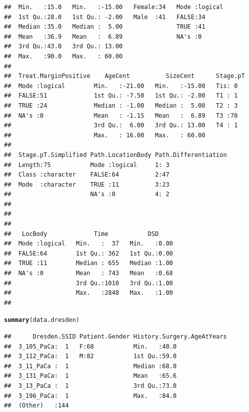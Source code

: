 \documentclass{article}\usepackage[]{graphicx}\usepackage[]{color}
\makeatletter
\newcommand{\hlstd}[1]{\textcolor[rgb]{0.345,0.345,0.345}{#1}}%
\newcommand{\hlkwd}[1]{\textcolor[rgb]{0.737,0.353,0.396}{\textbf{#1}}}%
\newenvironment{kframe}{%
 \def\at@end@of@kframe{}%
 \ifinner\ifhmode%
  \def\at@end@of@kframe{\end{minipage}}%
  \begin{minipage}{\columnwidth}%
 \fi\fi%
 \def\FrameCommand##1{\hskip\@totalleftmargin \hskip-\fboxsep
 \colorbox{shadecolor}{##1}\hskip-\fboxsep
     \hskip-\linewidth \hskip-\@totalleftmargin \hskip\columnwidth}%
 \MakeFramed {\advance\hsize-\width
   \@totalleftmargin\z@ \linewidth\hsize
   \@setminipage}}%
 {\par\unskip\endMakeFramed%
 \at@end@of@kframe}
\newenvironment{knitrout}{}{} %
\makeatother
\begin{document}
\begin{knitrout}
\begin{kframe}
\begin{verbatim}
##  Min.   :15.0   Min.   :-15.00   Female:34   Mode :logical  
##  1st Qu.:28.0   1st Qu.: -2.00   Male  :41   FALSE:34       
##  Median :35.0   Median :  5.00               TRUE :41       
##  Mean   :36.9   Mean   :  6.89               NA's :0        
##  3rd Qu.:43.0   3rd Qu.: 13.00                              
##  Max.   :90.0   Max.   : 60.00                              
##                                                             
##  Treat.MarginPositive    AgeCent          SizeCent      Stage.pT
##  Mode :logical        Min.   :-21.00   Min.   :-15.00   Tis: 0  
##  FALSE:51             1st Qu.: -7.50   1st Qu.: -2.00   T1 : 1  
##  TRUE :24             Median : -1.00   Median :  5.00   T2 : 3  
##  NA's :0              Mean   : -1.15   Mean   :  6.89   T3 :70  
##                       3rd Qu.:  6.00   3rd Qu.: 13.00   T4 : 1  
##                       Max.   : 16.00   Max.   : 60.00           
##                                                                 
##  Stage.pT.Simplified Path.LocationBody Path.Differentiation
##  Length:75           Mode :logical     1: 3                
##  Class :character    FALSE:64          2:47                
##  Mode  :character    TRUE :11          3:23                
##                      NA's :0           4: 2                
##                                                            
##                                                            
##                                                            
##   LocBody             Time           DSD      
##  Mode :logical   Min.   :  37   Min.   :0.00  
##  FALSE:64        1st Qu.: 362   1st Qu.:0.00  
##  TRUE :11        Median : 655   Median :1.00  
##  NA's :0         Mean   : 743   Mean   :0.68  
##                  3rd Qu.:1010   3rd Qu.:1.00  
##                  Max.   :2848   Max.   :1.00  
## 
\end{verbatim}
\begin{alltt}
\hlkwd{summary}\hlstd{(data.dresden)}
\end{alltt}
\begin{verbatim}
##      Dresden.SSID Patient.Gender History.Surgery.AgeAtYears
##  3_105_PaCa:  1   F:68           Min.   :40.0              
##  3_112_PaCa:  1   M:82           1st Qu.:59.0              
##  3_11_PaCa :  1                  Median :68.0              
##  3_131_PaCa:  1                  Mean   :65.6              
##  3_13_PaCa :  1                  3rd Qu.:73.0              
##  3_196_PaCa:  1                  Max.   :84.0              
##  (Other)   :144                                            

\end{verbatim}
\end{kframe}
\end{knitrout}
\end{document}

